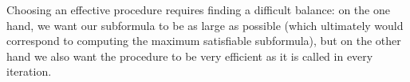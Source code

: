 Choosing an effective \grow procedure requires finding a difficult balance: on the one hand, we want our subformula to be as large as possible (which ultimately would correspond to computing the maximum satisfiable subformula), %
but on the other hand we also want the procedure to be very efficient as it is called in every iteration. 

